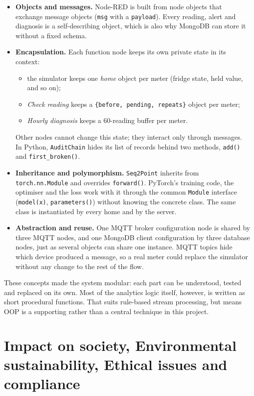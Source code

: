 \documentclass[12pt,a4paper,oneside]{report}
\begin{document}
\begin{itemize}
\item \textbf{Objects and messages.} Node-RED is built from node objects that exchange message objects (\texttt{msg} with a \texttt{payload}). Every reading, alert and diagnosis is a self-describing object, which is also why MongoDB can store it without a fixed schema.
\item \textbf{Encapsulation.} Each function node keeps its own private state in its context:
  \begin{itemize}
  \item the simulator keeps one \emph{home} object per meter (fridge state, held value, and so on);
  \item \emph{Check reading} keeps a \texttt{\{before, pending, repeats\}} object per meter;
  \item \emph{Hourly diagnosis} keeps a 60-reading buffer per meter.
  \end{itemize}
  Other nodes cannot change this state; they interact only through messages. In Python, \texttt{AuditChain} hides its list of records behind two methods, \texttt{add()} and \texttt{first\_broken()}.
\item \textbf{Inheritance and polymorphism.} \texttt{Seq2Point} inherits from \texttt{torch.nn.Module} and overrides \texttt{forward()}. PyTorch's training code, the optimiser and the loss work with it through the common \texttt{Module} interface (\texttt{model(x)}, \texttt{parameters()}) without knowing the concrete class. The same class is instantiated by every home and by the server.
\item \textbf{Abstraction and reuse.} One MQTT broker configuration node is shared by three MQTT nodes, and one MongoDB client configuration by three database nodes, just as several objects can share one instance. MQTT topics hide which device produced a message, so a real meter could replace the simulator without any change to the rest of the flow.
\end{itemize}

These concepts made the system modular: each part can be understood, tested and replaced on its own. Most of the analytics logic itself, however, is written as short procedural functions. That suits rule-based stream processing, but means OOP is a supporting rather than a central technique in this project.

\section{Impact on society, Environmental sustainability, Ethical issues and compliance}
\end{document}

